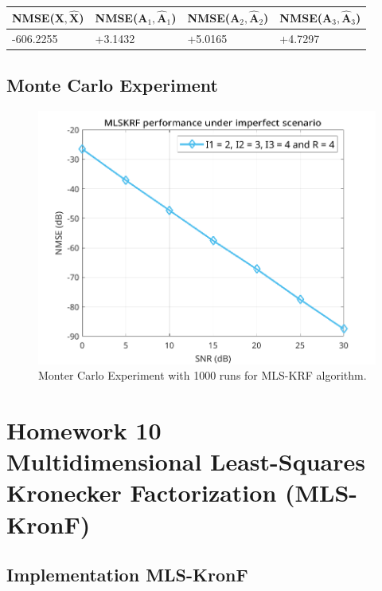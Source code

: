 \documentclass[a4paper,10pt]{article}
\begin{document}
    \begin{table}[ht!]
        \centering
        \begin{tabular}{|l|l|l|l|}
        \hline
        NMSE($\boldsymbol{X}, \boldsymbol{\hat{X}}$) & NMSE($\boldsymbol{A}_{1}, \boldsymbol{\hat{A}}_{1}$) & NMSE($\boldsymbol{A}_{2}, \boldsymbol{\hat{A}}_{2}$) & NMSE($\boldsymbol{A}_{3}, \boldsymbol{\hat{A}}_{3}$) \\ \hline
        -606.2255 & +3.1432 & +5.0165 & +4.7297 \\ \hline
        \end{tabular}
    \end{table}

    \subsection*{Monte Carlo Experiment}

    \begin{figure}[ht!]
        \centering 
        \includegraphics[width=0.75\linewidth]{figs/hw9.png} \par 
        \caption{Monter Carlo Experiment with 1000 runs for MLS-KRF algorithm.}
        \label{fig:hw9} 
    \end{figure}

\newpage
\section*{Homework 10 \\ Multidimensional Least-Squares Kronecker Factorization
(MLS-KronF)}

    \subsection*{Implementation MLS-KronF}
\end{document}
